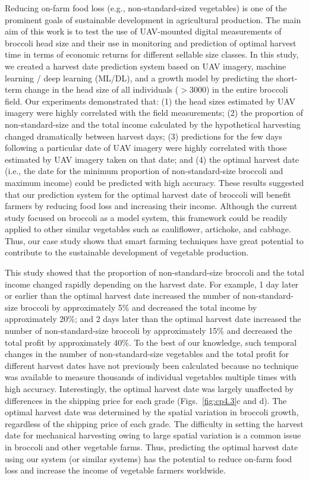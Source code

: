 Reducing on-farm food loss (e.g., non-standard-sized vegetables) is one of the prominent goals of sustainable development in agricultural production. The main aim of this work is to test the use of UAV-mounted digital measurements of broccoli head size and their use in monitoring and prediction of optimal harvest time in terms of economic returns for different sellable size classes. In this study, we created a harvest date prediction system based on UAV imagery, machine learning / deep learning (ML/DL), and a growth model by predicting the short-term change in the head size of all individuals ($> 3000$) in the entire broccoli field. Our experiments demonstrated that: (1) the head sizes estimated by UAV imagery were highly correlated with the field measurements; (2) the proportion of non-standard-size and the total income calculated by the hypothetical harvesting changed dramatically between harvest days; (3) predictions for the few days following a particular date of UAV imagery were highly correlated with those estimated by UAV imagery taken on that date; and (4) the optimal harvest date (i.e., the date for the minimum proportion of non-standard-size broccoli and maximum income) could be predicted with high accuracy. These results suggested that our prediction system for the optimal harvest date of broccoli will benefit farmers by reducing food loss and increasing their income. Although the current study focused on broccoli as a model system, this framework could be readily applied to other similar vegetables such as cauliflower, artichoke, and cabbage. Thus, our case study shows that smart farming techniques have great potential to contribute to the sustainable development of vegetable production.

This study showed that the proportion of non-standard-size broccoli and the total income changed rapidly depending on the harvest date. For example, 1 day later or earlier than the optimal harvest date increased the number of non-standard-size broccoli by approximately 5\% and decreased the total income by approximately 20\%; and 2 days later than the optimal harvest date increased the number of non-standard-size broccoli by approximately 15\% and decreased the total profit by approximately 40\%. To the best of our knowledge, such temporal changes in the number of non-standard-size vegetables and the total profit for different harvest dates have not previously been calculated because no technique was available to measure thousands of individual vegetables multiple times with high accuracy. Interestingly, the optimal harvest date was largely unaffected by differences in the shipping price for each grade (Figs.~\ref{fig:cp4.3}c and d). The optimal harvest date was determined by the spatial variation in broccoli growth, regardless of the shipping price of each grade. The difficulty in setting the harvest date for mechanical harvesting owing to large spatial variation is a common issue in broccoli and other vegetable farms. Thus, predicting the optimal harvest date using our system (or similar systems) has the potential to reduce on-farm food loss and increase the income of vegetable farmers worldwide.

